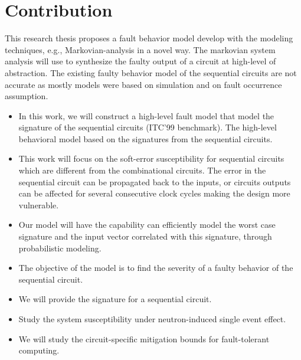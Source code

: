   

\section{Contribution}


This research thesis proposes a fault behavior model develop with the modeling techniques, e.g., Markovian-analysis in a novel way. The markovian system analysis will use to synthesize the faulty output of a circuit at high-level of abstraction. The existing faulty behavior model of the sequential circuits are not accurate as mostly models were based on simulation and on fault occurrence assumption.


\begin{itemize}

\item In this work, we will construct a high-level fault model that model the signature of the sequential circuits (ITC'99 benchmark). The high-level behavioral model based on the signatures from the sequential circuits.

\item This work will focus on the soft-error susceptibility for sequential circuits which are different from the combinational circuits. The error in the sequential circuit can be propagated back to the inputs, or circuits outputs can be affected for several consecutive clock cycles making the design more vulnerable. 
\item Our model will have the capability can efficiently model the worst case signature and the input vector correlated with this signature, through probabilistic modeling.
\item The objective of the model is to find the severity of a faulty behavior of the sequential circuit.

\item We will provide the signature for a sequential circuit. 
\item Study the system susceptibility under neutron-induced single event effect.
\item We will study the circuit-specific mitigation bounds for fault-tolerant computing.
\end{itemize}

